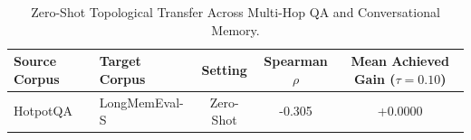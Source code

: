 \begin{table}[t]
\centering
\small
\caption{Zero-Shot Topological Transfer Across Multi-Hop QA and Conversational Memory.}
\label{tab:zero_shot_transfer}
\begin{tabular}{llccc}
\toprule
\textbf{Source Corpus} & \textbf{Target Corpus} & \textbf{Setting} & \textbf{Spearman $\rho$} & \textbf{Mean Achieved Gain ($\tau=0.10$)} \\
\midrule
HotpotQA & LongMemEval-S & Zero-Shot & -0.305 & +0.0000 \\
\bottomrule
\end{tabular}
\end{table}